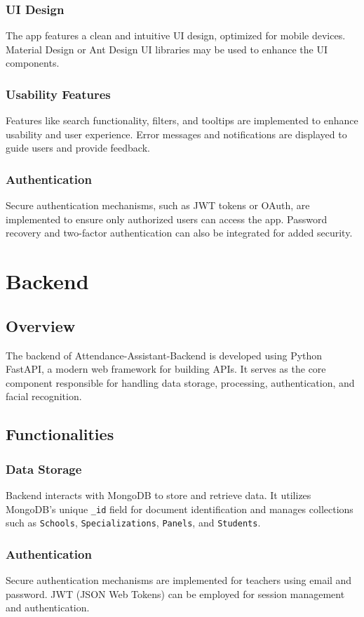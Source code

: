 \documentclass[conference]{IEEEtran}
\begin{document}
\subsubsection{UI Design}
The app features a clean and intuitive UI design, optimized for mobile devices. Material Design or Ant Design UI libraries may be used to enhance the UI components.

\subsubsection{Usability Features}
Features like search functionality, filters, and tooltips are implemented to enhance usability and user experience. Error messages and notifications are displayed to guide users and provide feedback.

\subsubsection{Authentication}
Secure authentication mechanisms, such as JWT tokens or OAuth, are implemented to ensure only authorized users can access the app. Password recovery and two-factor authentication can also be integrated for added security.


\section{Backend}
\subsection{Overview}
The backend of Attendance-Assistant-Backend is developed using Python FastAPI, a modern web framework for building APIs. It serves as the core component responsible for handling data storage, processing, authentication, and facial recognition.

\subsection{Functionalities}
\subsubsection{Data Storage}
Backend interacts with MongoDB to store and retrieve data. It utilizes MongoDB's unique \texttt{\_id} field for document identification and manages collections such as \texttt{Schools}, \texttt{Specializations}, \texttt{Panels}, and \texttt{Students}.

\subsubsection{Authentication}
Secure authentication mechanisms are implemented for teachers using email and password. JWT (JSON Web Tokens) can be employed for session management and authentication.
\end{document}
